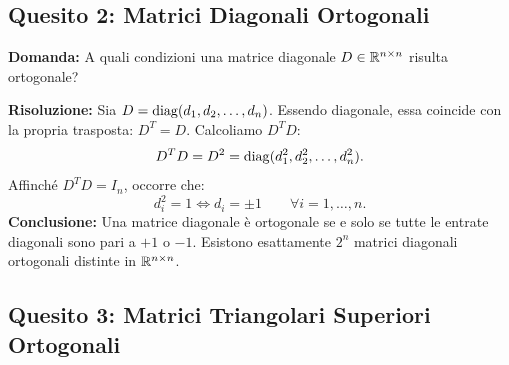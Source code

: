 \subsection{Quesito 2: Matrici Diagonali Ortogonali}

\begin{example}
\textbf{Domanda:} A quali condizioni una matrice diagonale $D \in \mathbb{R}^{n \times n}$ risulta ortogonale?

\textbf{Risoluzione:} Sia $D = \operatorname{diag}(d_1, d_2, \dots, d_n)$. Essendo diagonale, essa coincide con la propria trasposta: $D^T = D$. Calcoliamo $D^T D$:
\begin{equation}
    D^T D = D^2 = \operatorname{diag}(d_1^2, d_2^2, \dots, d_n^2).
\end{equation}
Affinch\'e $D^T D = I_n$, occorre che:
\begin{equation}
    d_i^2 = 1 \iff d_i = \pm 1 \qquad \forall i = 1, \dots, n.
\end{equation}
\textbf{Conclusione:} Una matrice diagonale \`e ortogonale se e solo se tutte le entrate diagonali sono pari a $+1$ o $-1$. Esistono esattamente $2^n$ matrici diagonali ortogonali distinte in $\mathbb{R}^{n \times n}$.
\end{example}

\subsection{Quesito 3: Matrici Triangolari Superiori Ortogonali}

